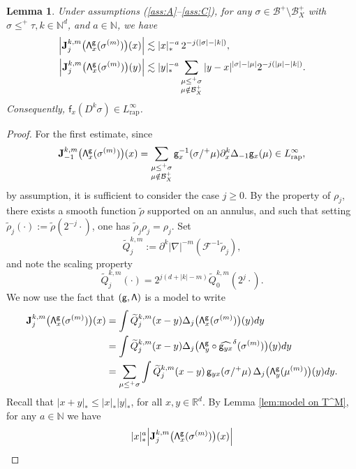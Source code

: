 \documentclass[11pt]{article}
\numberwithin{equation}{section}
\theoremstyle{plain}
\newtheorem{lem}[thm]{Lemma}
\theoremstyle{definition}
\newcommand{\rap}{\mathrm{rap}}
\newcommand{\bfJ}{\mathbf{J}}
\newcommand{\sff}{\mathsf{f}}
\newcommand{\sfg}{\mathsf{g}}
\newcommand{\bbN}{\mathbb{N}}
\newcommand{\bbR}{\mathbb{R}}
\newcommand{\mcB}{\mathcal{B}}
\newcommand{\mcF}{\mathcal{F}}
\begin{document}
\begin{lem} \label{lem:I_j^k}
Under assumptions \textup{(\ref{ass:A}--\ref{ass:C})}, for any $\sigma\in\mcB^+\setminus\mcB_X^+$ with $\sigma\le^+\tau, k\in\bbN^d$, and $a\in\bbN$, we have
\begin{align*}
\Big|\bfJ_j^{k,m}\bigl({\sf\Lambda}^{\sfg}_x(\sigma^{(m)})\bigr)(x)\Big| &\lesssim|x|_*^{-a}\,2^{-j(|\sigma|-|k|)}, \\
\Big|\bfJ_j^{k,m}\bigl({\sf\Lambda}^{\sfg}_x(\sigma^{(m)})\bigr)(y)\Big| &\lesssim|y|_*^{-a}\sum_{\substack{\mu\le^+\sigma\\\mu\notin\mcB_X^+}}|y-x|^{|\sigma|-|\mu|}2^{-j(|\mu|-|k|)}.
\end{align*}
Consequently, $\sff_x(D^k\sigma)\in L_\rap^\infty$.
\end{lem}

\begin{proof}
For the first estimate, since
\[
\bfJ_{-1}^{k,m}\bigl({\sf\Lambda}^{\sfg}_x(\sigma^{(m)})\bigr)(x) = \sum_{\substack{\mu\leq^+\sigma\\\mu\notin\mcB_X^+}}\sfg_x^{-1}(\sigma/^+\mu)\partial_x^k\Delta_{-1}\sfg_x(\mu) \in L_\rap^\infty,
\]
by assumption, it is sufficient to consider the case $j\ge0$. By the property of $\rho_j$, there exists a smooth function $\tilde\rho$ supported on an annulus, and such that setting $\tilde\rho_j(\cdot) := \tilde\rho(2^{-j}\cdot)$, one has $\widetilde{\rho}_j\rho_j=\rho_j$. Set
\[
\widetilde{Q}_j^{k,m} := \partial^k|\nabla|^{-m}(\mcF^{-1}\tilde{\rho}_j),
\]
and note the scaling property
\[
\widetilde{Q}_j^{k,m}(\cdot) = 2^{j(d+|k|-m)}\widetilde{Q}_0^{k,m}(2^j\cdot).
\]
We now use the fact that $\sf (g,\Lambda)$ is a model to write
\begin{align*}
\bfJ_j^{k,m}\bigl({\sf \Lambda}^{\sfg}_x(\sigma^{(m)})\bigr)(x)
&=\int \widetilde{Q}_j^{k,m}(x-y)\Delta_j\bigl({\sf\Lambda}^{\sfg}_x(\sigma^{(m)})\bigr)(y)dy \\
&=\int \widetilde{Q}_j^{k,m}(x-y)\Delta_j\bigl({\sf\Lambda}^{\sfg}_y\circ\widehat{\sfg_{yx}}^\delta(\sigma^{(m)})\bigr)(y)dy \\
&=\sum_{\mu\le^+\sigma} \int \widetilde{Q}_j^{k,m}(x-y)\,\sfg_{yx}(\sigma/^+\mu)\,\Delta_j\bigl({\sf\Lambda}^{\sfg}_y(\mu^{(m)})\bigr)(y)dy.
\end{align*}
Recall that $|x+y|_*\leq |x|_* |y|_*$, for all $x,y\in\bbR^d$. By Lemma \ref{lem:model on T^M}, for any $a\in\bbN$ we have
\begin{align*}
|x|_*^a\Big|\bfJ_j^{k,m}&\bigl({\sf\Lambda}^{\sfg}_x(\sigma^{(m)})\bigr)(x)\Big| \\

\end{align*}
\end{proof}
\end{document}
